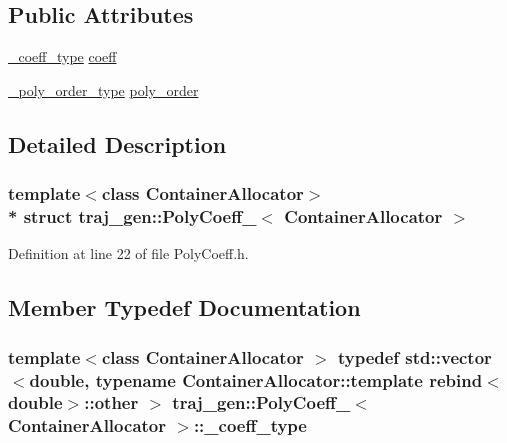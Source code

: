 \subsection*{Public Attributes}
\begin{DoxyCompactItemize}
\item 
\hyperlink{structtraj__gen_1_1_poly_coeff___a957ab1b353d94d374008e9a073e030f0}{\+\_\+coeff\+\_\+type} \hyperlink{structtraj__gen_1_1_poly_coeff___a93380cf7db017ab6e9d0ae40dac1e5b9}{coeff}
\item 
\hyperlink{structtraj__gen_1_1_poly_coeff___a33d9b89513ff0ce3f0c9085468edbfe6}{\+\_\+poly\+\_\+order\+\_\+type} \hyperlink{structtraj__gen_1_1_poly_coeff___aebcfb1e923a4299083c6c3402a3e1450}{poly\+\_\+order}
\end{DoxyCompactItemize}


\subsection{Detailed Description}
\subsubsection*{template$<$class Container\+Allocator$>$\\*
struct traj\+\_\+gen\+::\+Poly\+Coeff\+\_\+$<$ Container\+Allocator $>$}



Definition at line 22 of file Poly\+Coeff.\+h.



\subsection{Member Typedef Documentation}
\subsubsection[{\texorpdfstring{\+\_\+coeff\+\_\+type}{_coeff_type}}]{\setlength{\rightskip}{0pt plus 5cm}template$<$class Container\+Allocator $>$ typedef std\+::vector$<$double, typename Container\+Allocator\+::template rebind$<$double$>$\+::other $>$ {\bf traj\+\_\+gen\+::\+Poly\+Coeff\+\_\+}$<$ Container\+Allocator $>$\+::{\bf \+\_\+coeff\+\_\+type}}\hypertarget{structtraj__gen_1_1_poly_coeff___a957ab1b353d94d374008e9a073e030f0}{}\label{structtraj__gen_1_1_poly_coeff___a957ab1b353d94d374008e9a073e030f0}


